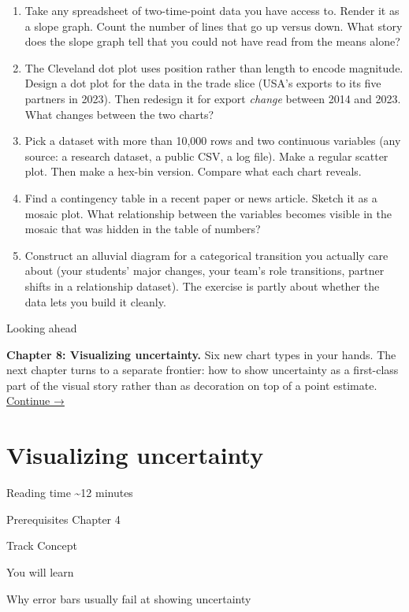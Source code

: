 \documentclass[
  letterpaper,
  11pt,
  twoside,
  openany]{scrbook}
\begin{document}
\begin{enumerate}
\def\labelenumi{\arabic{enumi}.}
\item
  Take any spreadsheet of two-time-point data you have access to. Render
  it as a slope graph. Count the number of lines that go up versus down.
  What story does the slope graph tell that you could not have read from
  the means alone?
\item
  The Cleveland dot plot uses position rather than length to encode
  magnitude. Design a dot plot for the data in the trade slice (USA's
  exports to its five partners in 2023). Then redesign it for export
  \emph{change} between 2014 and 2023. What changes between the two
  charts?
\item
  Pick a dataset with more than 10,000 rows and two continuous variables
  (any source: a research dataset, a public CSV, a log file). Make a
  regular scatter plot. Then make a hex-bin version. Compare what each
  chart reveals.
\item
  Find a contingency table in a recent paper or news article. Sketch it
  as a mosaic plot. What relationship between the variables becomes
  visible in the mosaic that was hidden in the table of numbers?
\item
  Construct an alluvial diagram for a categorical transition you
  actually care about (your students' major changes, your team's role
  transitions, partner shifts in a relationship dataset). The exercise
  is partly about whether the data lets you build it cleanly.
\end{enumerate}

{Looking ahead}

\textbf{Chapter 8: Visualizing uncertainty.} Six new chart types in your
hands. The next chapter turns to a separate frontier: how to show
uncertainty as a first-class part of the visual story rather than as
decoration on top of a point estimate.
\href{08-visualizing-uncertainty.qmd}{Continue →}

\chapter{Visualizing uncertainty}\label{visualizing-uncertainty}

{Reading time} {\textasciitilde12 minutes}

{Prerequisites} {Chapter 4}

{Track} {Concept}

{You will learn}

Why error bars usually fail at showing uncertainty
\end{document}
